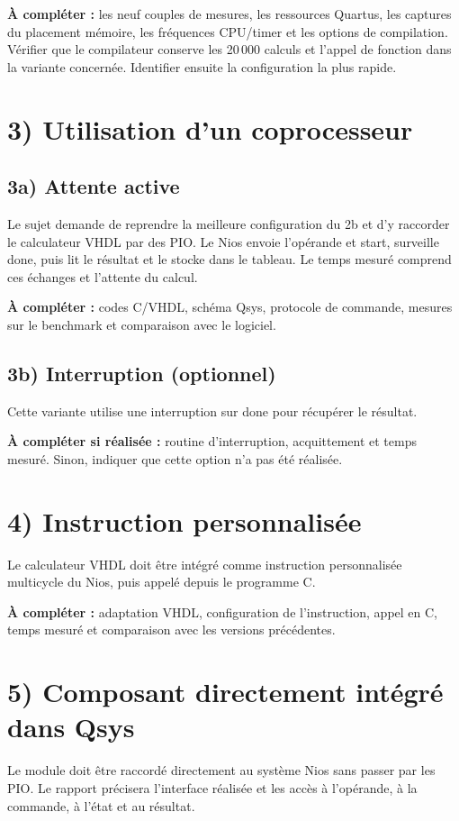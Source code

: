 \documentclass[a4paper,11pt]{article}
\begin{document}
\textbf{À compléter :} les neuf couples de mesures, les ressources Quartus, les captures du placement mémoire, les fréquences CPU/timer et les options de compilation. Vérifier que le compilateur conserve les 20\,000 calculs et l’appel de fonction dans la variante concernée. Identifier ensuite la configuration la plus rapide.

\clearpage
\section*{3) Utilisation d’un coprocesseur}
\subsection*{3a) Attente active}
Le sujet demande de reprendre la meilleure configuration du 2b et d’y raccorder le calculateur VHDL par des PIO. Le Nios envoie l’opérande et start, surveille done, puis lit le résultat et le stocke dans le tableau. Le temps mesuré comprend ces échanges et l’attente du calcul.

\textbf{À compléter :} codes C/VHDL, schéma Qsys, protocole de commande, mesures sur le benchmark et comparaison avec le logiciel.

\subsection*{3b) Interruption (optionnel)}
Cette variante utilise une interruption sur done pour récupérer le résultat.

\textbf{À compléter si réalisée :} routine d’interruption, acquittement et temps mesuré. Sinon, indiquer que cette option n’a pas été réalisée.

\section*{4) Instruction personnalisée}
Le calculateur VHDL doit être intégré comme instruction personnalisée multicycle du Nios, puis appelé depuis le programme C.

\textbf{À compléter :} adaptation VHDL, configuration de l’instruction, appel en C, temps mesuré et comparaison avec les versions précédentes.

\section*{5) Composant directement intégré dans Qsys}
Le module doit être raccordé directement au système Nios sans passer par les PIO. Le rapport précisera l’interface réalisée et les accès à l’opérande, à la commande, à l’état et au résultat.
\end{document}
